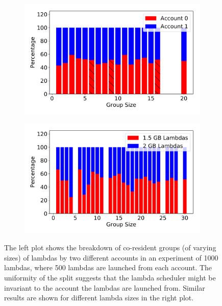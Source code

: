 \begin{figure}[!t]
    \begin{subfigure}{.5\textwidth}
      \centering
      \includegraphics[width=.99\linewidth]{fig/different-accounts.pdf}
    \end{subfigure}%
    \begin{subfigure}{.5\textwidth}
      \centering
      \includegraphics[width=.99\linewidth]{fig/different-sizes.pdf}
    \end{subfigure}

    \caption{The left plot shows the breakdown of co-resident groups (of varying
    sizes) of lambdas by two different accounts in an experiment of 1000
    lambdas, where 500 lambdas are launched from each account. The uniformity of
    the split suggests that the lambda scheduler might be invariant to the
    account the lambdas are launched from. Similar results are shown for
    different lambda sizes in the right plot. }
    \label{fig:factors}
\end{figure}


